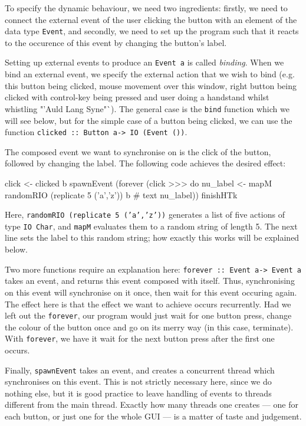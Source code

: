 To specify the dynamic behaviour, we need two ingredients: firstly, we
need to connect the external event of the user clicking the button
with an element of the data type \texttt{Event}, and secondly, we need
to set up the program such that it reacts to the occurence of this
event by changing the button's label. 

Setting up external events to produce an \texttt{Event a} is called
\emph{binding}. When we bind an external event, we specify the
external action that we wish to bind (e.g. this button being clicked,
mouse movement over this window, right button being clicked with
control-key being pressed and user doing a handstand whilst whistling
"'Auld Lang Syne"`). The general case is the \texttt{bind} function
which we will see below, but for the simple case of a button being
clicked, we can use the function \texttt{clicked :: Button a-> IO
  (Event ())}. 

The composed event we want to synchronise on is the click of the
button, followed by changing the label. The following code achieves
the desired effect:
\begin{code}
     click <- clicked b
     spawnEvent 
      (forever 
        (click >>> do nu_label <- mapM randomRIO (replicate 5 ('a','z'))
                      b # text nu_label))
     finishHTk
\end{code}     
Here, \texttt{randomRIO (replicate 5 ('a','z'))} generates a list of
five actions of type \texttt{IO Char}, and \texttt{mapM} evaluates
them to a random string of length 5. The next line sets the label to
this random string; how exactly this works will be explained below.

Two more functions require an explanation here: \texttt{forever ::
  Event a-> Event a} takes an event, and returns this event composed
with itself. Thus, synchronising on this event will synchronise on it
once, then wait for this event occuring again. The effect here is that
the effect we want to achieve occurs recurrently. Had we left out the
\texttt{forever}, our program would just wait for one button press,
change the colour of the button once and go on its merry way (in this
case, terminate). With \texttt{forever}, we have it wait for the next
button press after the first one occurs. 

Finally, \texttt{spawnEvent} takes an event, and creates a concurrent
thread which synchronises on this event. This is not strictly
necessary here, since we do nothing else, but it is good practice to
leave handling of events to threads different from the main thread.
Exactly how many threads one creates --- one for each button, or just
one for the whole GUI --- is a matter of taste and judgement.

